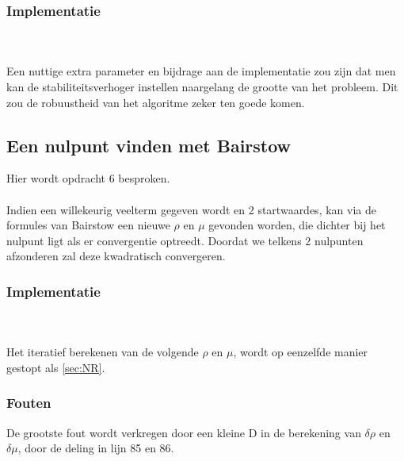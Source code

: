 \documentclass[a4paper,kulak]{kulakarticle}
\begin{document}
\subsubsection{Implementatie}

~\\~\\

Een nuttige extra parameter en bijdrage aan de implementatie zou zijn dat men kan de stabiliteitsverhoger instellen naargelang de grootte van het probleem. Dit zou de robuustheid van het algoritme zeker ten goede komen.

\subsection{Een nulpunt vinden met Bairstow}
Hier wordt opdracht 6 besproken.
\\~\\
Indien een willekeurig veelterm gegeven wordt en 2 startwaardes, kan via de formules van Bairstow een nieuwe $\rho$ en $\mu$ gevonden worden, die dichter bij het nulpunt ligt als er convergentie optreedt. Doordat we telkens 2 nulpunten afzonderen zal deze kwadratisch convergeren.

\subsubsection{Implementatie}



~\\~\\
Het iteratief berekenen van de volgende $\rho$ en $\mu$, wordt op eenzelfde manier gestopt als \ref{sec:NR}.

\subsubsection{Fouten}
De grootste fout wordt verkregen door een kleine D in de berekening van $\delta \rho$ en $\delta \mu$, door de deling in lijn 85 en 86.
\end{document}
